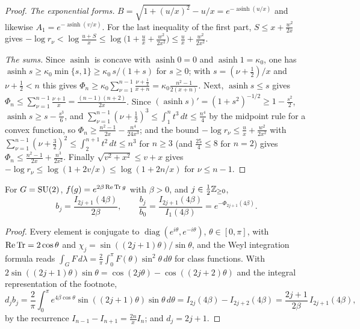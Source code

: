\begin{proof}
\emph{The exponential forms.} $B=\sqrt{1+(u/x)^2}-u/x=e^{-\operatorname{asinh}
(u/x)}$ and likewise $A_1=e^{-\operatorname{asinh}(v/x)}$. For the last
inequality of the first part, $S\le x+\frac{w^2}{2x}$ gives $-\log r_\nu<
\log\frac{u+S}x\le\log\bigl(1+\frac ux+\frac{w^2}{2x^2}\bigr)\le\frac ux+
\frac{w^2}{2x^2}$.

\emph{The sums.} Since $\operatorname{asinh}$ is concave with
$\operatorname{asinh}0=0$ and $\operatorname{asinh}1=\kappa_0$, one has
$\operatorname{asinh}s\ge\kappa_0\min\{s,1\}\ge\kappa_0\,s/(1+s)$ for $s\ge0$;
with $s=(\nu+\frac12)/x$ and $\nu+\frac12<n$ this gives $\Phi_n\ge\kappa_0
\sum_{\nu=1}^{n-1}\frac{\nu+\frac12}{x+n}=\kappa_0\frac{n^2-1}{2(x+n)}$. Next,
$\operatorname{asinh}s\le s$ gives $\Phi_n\le\sum_{\nu=1}^{n-1}\frac{\nu+1}x=
\frac{(n-1)(n+2)}{2x}$. Since $(\operatorname{asinh}s)'=(1+s^2)^{-1/2}\ge1-
\frac{s^2}2$, $\operatorname{asinh}s\ge s-\frac{s^3}6$, and $\sum_{\nu=1}^{n-1}
(\nu+\frac12)^3\le\int_1^nt^3\,dt\le\frac{n^4}4$ by the midpoint rule for a
convex function, so $\Phi_n\ge\frac{n^2-1}{2x}-\frac{n^4}{24x^3}$; and the
bound $-\log r_\nu\le\frac ux+\frac{w^2}{2x^2}$ with $\sum_{\nu=1}^{n-1}
(\nu+\frac32)^2\le\int_2^{n+1}t^2\,dt\le n^3$ for $n\ge3$ (and $\frac{25}4\le
8$ for $n=2$) gives $\Phi_n\le\frac{n^2-1}{2x}+\frac{n^3}{2x^2}$. Finally
$\sqrt{v^2+x^2}\le v+x$ gives $-\log r_\nu\le\log(1+2v/x)\le\log(1+2n/x)$ for
$\nu\le n-1$.
\end{proof}

\begin{lemma}\label{lem:su2coef}
For $G=\mathrm{SU}(2)$, $f(g)=e^{2\beta\operatorname{Re}\operatorname{Tr} g}$ with $\beta>0$, and $j\in\frac12\mathbb{Z}_{\ge0}$,
\[
b_j=\frac{I_{2j+1}(4\beta)}{2\beta},\qquad
\frac{b_j}{b_0}=\frac{I_{2j+1}(4\beta)}{I_1(4\beta)}=e^{-\Phi_{2j+1}(4\beta)} .
\]
\end{lemma}

\begin{proof}
Every element is conjugate to $\operatorname{diag}(e^{i\theta},e^{-i\theta})$,
$\theta\in[0,\pi]$, with $\operatorname{Re}\operatorname{Tr}=2\cos\theta$ and $\chi_j=\sin((2j+1)\theta)/
\sin\theta$, and the Weyl integration formula reads $\int_GF\,d\lambda=
\frac2\pi\int_0^\pi F(\theta)\sin^2\theta\,d\theta$ for class functions. With
$2\sin((2j+1)\theta)\sin\theta=\cos(2j\theta)-\cos((2j+2)\theta)$ and the
integral representation of the footnote,
\[
d_jb_j=\frac2\pi\int_0^\pi e^{4\beta\cos\theta}\sin((2j+1)\theta)\sin\theta\,
d\theta=I_{2j}(4\beta)-I_{2j+2}(4\beta)=\frac{2j+1}{2\beta}\,I_{2j+1}(4\beta),
\]
by the recurrence $I_{n-1}-I_{n+1}=\frac{2n}xI_n$; and $d_j=2j+1$.
\end{proof}

